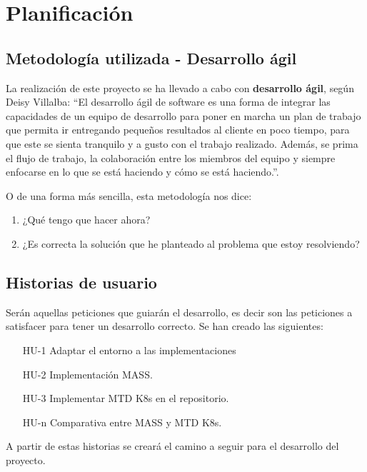 \chapter{Planificación}

\section{Metodología utilizada - Desarrollo ágil}
La realización de este proyecto se ha llevado a cabo con \textbf{desarrollo ágil}, según Deisy Villalba: ``El desarrollo ágil de software es una forma de integrar las capacidades de un equipo de desarrollo para poner en marcha un plan de trabajo que permita ir entregando pequeños resultados al cliente en poco tiempo, para que este se sienta tranquilo y a gusto con el trabajo realizado. Además, se prima el flujo de trabajo, la colaboración entre los miembros del equipo y siempre enfocarse en lo que se está haciendo y cómo se está haciendo.''\cite{desarrollo-agil}.

O de una forma más sencilla, esta metodología nos dice:
\begin{enumerate}
    \item ¿Qué tengo que hacer ahora?
    \item ¿Es correcta la solución que he planteado al problema que estoy resolviendo?
\end{enumerate}

\section{Historias de usuario}
Serán aquellas peticiones que guiarán el desarrollo, es decir son las peticiones a satisfacer para tener un desarrollo correcto. Se han creado las siguientes:
\begin{itemize}
    \item [HU-1] Adaptar el entorno a las implementaciones
    \item [HU-2] Implementación MASS.
    \item [HU-3] Implementar MTD K8s en el repositorio.
    \item [HU-n] Comparativa entre MASS y MTD K8s.
\end{itemize}
A partir de estas historias se creará el camino a seguir para el desarrollo del proyecto.

